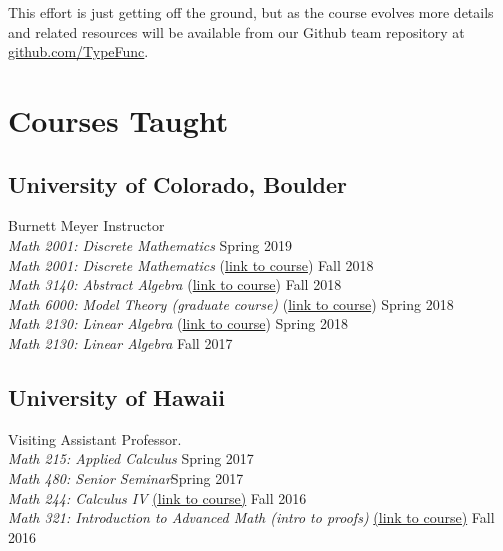 This effort is just getting off the ground, but as the course evolves more details
and related resources will be available from our Github team repository at
\href{https://github.com/TypeFunc}{github.com/TypeFunc}.

\bigskip

\bigskip




\newpage

\appendix

\pagestyle{fancy}\chead{} 
 \lfoot{} \rfoot{\thepage} \cfoot{}

\newcommand\cors[2]{\textit{#1: #2}}
\newcommand\crsu[3]{\textit{#1: #2} (\href{#3}{\small link to course})}
\newcommand\semr[1]{\hfill #1\\[\Xpt]}
    
\section{Courses Taught}
\newcommand\myskip{2mm}
\subsection{University of Colorado, Boulder}
Burnett Meyer Instructor\\[3pt]
\noindent \cors{Math 2001}
     {Discrete Mathematics}
\semr{Spring 2019}
\crsu{Math 2001}
     {Discrete Mathematics}
     {https://github.com/williamdemeo/math2001-fall2018}
\semr{Fall 2018}
\crsu{Math 3140}
     {Abstract Algebra}
     {https://github.com/williamdemeo/math3140-fall2018}
\semr{Fall 2018}
\crsu{Math 6000}
     {Model Theory (graduate course)}
     {https://github.com/williamdemeo/math6000-spring2018}
\semr{Spring 2018}
\crsu{Math 2130}{Linear Algebra}
     {https://github.com/williamdemeo/math2130-spring2018}
     \semr{Spring 2018}
\cors{Math 2130}{Linear Algebra}
\semr{Fall 2017}
    
\medskip

\subsection*{University of Hawaii}
Visiting Assistant Professor.\\[3pt]
\noindent
\textsl{Math 215: Applied Calculus} \hfill  Spring 2017\\[\Xpt]
\textsl{Math 480: Senior Seminar}\hfill  Spring 2017\\[\Xpt]
\textsl{Math 244: Calculus IV} \href{https://github.com/williamdemeo/math244-fall2016}{{\small (link to course)}} \hfill  Fall 2016\\[\Xpt]
\textsl{Math 321: Introduction to Advanced Math (intro to proofs)} \href{https://github.com/williamdemeo/math321-fall2016}{{\small (link to course)}} \hfill  Fall 2016

